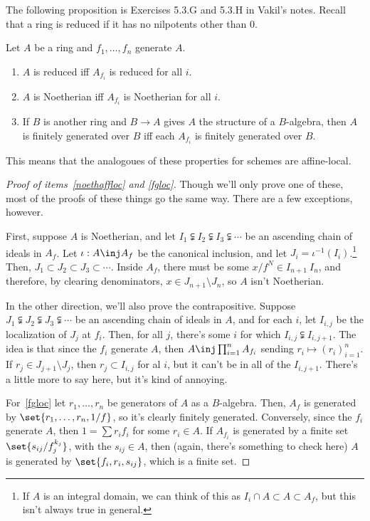 The following proposition is Exercises 5.3.G and 5.3.H in Vakil's notes. Recall that a ring is reduced if it has no
nilpotents other than \(0\).
\begin{prop}
Let \(A\) be a ring and \(f_1,\dotsc,f_n\) generate \(A\).
\begin{enumerate}
	\item \(A\) is reduced iff \(A_{f_i}\) is reduced for all \(i\).
	\item\label{noethaffloc} \(A\) is Noetherian iff \(A_{f_i}\) is Noetherian for all \(i\).
	\item\label{fgloc} If \(B\) is another ring and \(B\to A\) gives \(A\) the structure of a \(B\)-algebra, then
	\(A\) is finitely generated over \(B\) iff each \(A_{f_i}\) is finitely generated over \(B\).
\end{enumerate}
\end{prop}
This means that the analogoues of these properties for schemes are affine-local.
\begin{proof}[Proof of items~\eqref{noethaffloc} and \eqref{fgloc}]
Though we'll only prove one of these, most of the proofs of these things go the same way. There are a few
exceptions, however.

First, suppose \(A\) is Noetherian, and let \(I_1\subsetneqq I_2\subsetneqq I_3\subsetneqq\dotsb\) be an ascending
chain of ideals in \(A_f\). Let \(\iota:A\inj A_f\) be the canonical inclusion, and let \(J_i =
\iota^{-1}(I_i)\).\footnote{If \(A\) is an integral domain, we can think of this as \(I_i\cap A\subset A\subset A_f\),
but this isn't always true in general.} Then, \(J_1\subset J_2\subset J_3\subset\dotsb\). Inside \(A_f\), there
must be some \(x/f^N\in I_{n+1}\ I_n\), and therefore, by clearing denominators, \(x\in J_{n+1}\setminus J_n\), so
\(A\) isn't Noetherian.

In the other direction, we'll also prove the contrapositive. Suppose \(J_1\subsetneqq J_2\subsetneqq
J_3\subsetneqq\dotsb\) be an ascending chain of ideals in \(A\), and for each \(i\), let \(I_{i,j}\) be the
localization of \(J_j\) at \(f_i\). Then, for all \(j\), there's some \(i\) for which \(I_{i,j}\subsetneqq
I_{i,j+1}\). The idea is that since the \(f_i\) generate \(A\), then \(A\inj\prod_{i=1}^n A_{f_i}\) sending
\(r_i\mapsto (r_i)_{i=1}^n\). If \(r_j\in J_{j+1}\setminus J_j\), then \(r_j\subset I_{i,j}\) for al \(i\), but it
can't be in all of the \(I_{i,j+1}\). There's a little more to say here, but it's kind of annoying.

For~\eqref{fgloc} let \(r_1,\dotsc,r_n\) be generators of \(A\) as a \(B\)-algebra. Then, \(A_f\) is generated by
\(\set{r_1,\dotsc,r_n,1/f}\), so it's clearly finitely generated. Conversely, since the \(f_i\) generate \(A\),
then \(1 = \sum r_if_i\) for some \(r_i\in A\). If \(A_{f_i}\) is generated by a finite set
\(\set{s_{ij}/f_j^{k_j}}\), with the \(s_{ij}\in A\), then (again, there's something to check here) \(A\) is
generated by \(\set{f_i, r_i, s_{ij}}\), which is a finite set.
\end{proof}
